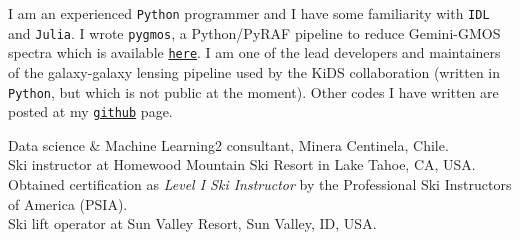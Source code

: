 \documentclass[11pt]{article}
\begin{document}
\pagebreak


I am an experienced \texttt{Python} programmer and I have some familiarity with
\texttt{IDL} and \texttt{Julia}. I wrote {\tt pygmos}, a Python/PyRAF pipeline to reduce 
Gemini-GMOS spectra which is available 
\href{https://github.com/cristobal-sifon/pygmos/}{\texttt{here}}. 
I am one of the lead 
developers and maintainers of the galaxy-galaxy lensing pipeline used by the 
KiDS collaboration (written in \texttt{Python}, but which is not public at the 
moment). Other codes I have written are posted at my 
\href{https://github.com/cristobal-sifon}{\texttt{github}} page.\\


\hline



\noindent
{} Data science \& Machine Learning2 consultant, Minera Centinela, Chile.\\
 Ski instructor at Homewood Mountain Ski Resort in Lake 
Tahoe, CA, USA. Obtained certification as \emph{Level I Ski Instructor} by the 
Professional Ski Instructors of America (PSIA).\\
 Ski lift operator at Sun Valley Resort, Sun Valley, ID, USA.\\


\end{document}
